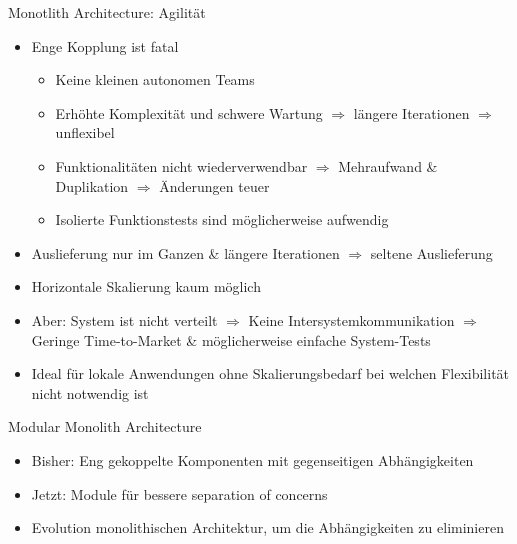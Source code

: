 \begin{frame}{Monotlith Architecture: Agilität}
    \begin{itemize}
        \item Enge Kopplung ist fatal
        \begin{itemize}
            \item Keine kleinen autonomen Teams
            \item Erhöhte Komplexität und schwere Wartung $\Rightarrow$ längere Iterationen $\Rightarrow$ unflexibel
            \item Funktionalitäten nicht wiederverwendbar $\Rightarrow$ Mehraufwand \& Duplikation $\Rightarrow$ Änderungen teuer
            \item Isolierte Funktionstests sind möglicherweise aufwendig
        \end{itemize}
        \item Auslieferung nur im Ganzen \& längere Iterationen $\Rightarrow$ seltene Auslieferung
        \item Horizontale Skalierung kaum möglich
        \item Aber: System ist nicht verteilt $\Rightarrow$ Keine Intersystemkommunikation $\Rightarrow$ Geringe Time-to-Market \& möglicherweise einfache System-Tests
        \item Ideal für lokale Anwendungen ohne Skalierungsbedarf bei welchen Flexibilität nicht notwendig ist
    \end{itemize}
\end{frame}


\begin{frame}{Modular Monolith Architecture}
    \begin{itemize}
       \item Bisher: Eng gekoppelte Komponenten mit gegenseitigen Abhängigkeiten
       \item Jetzt: Module für bessere separation of concerns
       \item Evolution monolithischen Architektur, um die Abhängigkeiten zu eliminieren
     \end{itemize}
\end{frame}

